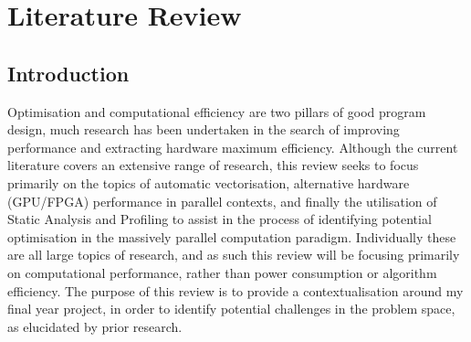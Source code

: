 
\section{Literature Review} 
\subsection{Introduction}
Optimisation and computational efficiency are two pillars of good program design, much research has
been undertaken in the search of improving performance and extracting hardware maximum efficiency.
Although the current literature covers an extensive range of research, this review seeks to focus
primarily on the topics of automatic vectorisation, alternative hardware (GPU/FPGA) performance in
parallel contexts, and finally the utilisation of Static Analysis and Profiling to assist in the
process of identifying potential optimisation in the massively parallel computation paradigm.
Individually these are all large topics of research, and as such this review will be focusing
primarily on computational performance, rather than power consumption or algorithm efficiency. The
purpose of this review is to provide a contextualisation around my final year project, in order to
identify potential challenges in the problem space, as elucidated by prior research. 

